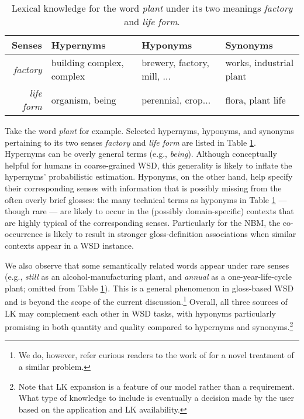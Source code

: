 \documentclass[11pt]{article}
\begin{document}
\def\halfTableWidth{.48\textwidth} \def\cellWidth{16mm}
\begin{table}[t]
  \centering
   \resizebox{\halfTableWidth}{!} {
  \begin{tabular}{r|p{\cellWidth}p{\cellWidth}p{\cellWidth}}
    \hline
    \hline
    Senses   &Hypernyms&Hyponyms &Synonyms\\
    \hline
    \textit{factory} & building complex, complex & brewery,
    factory, mill, ...  & works, industrial plant\\
    \hline
    \textit{life form} & organism, being & perennial, crop...  & flora, plant life\\
    \hline
    \hline
  \end{tabular}}
  \caption{Lexical knowledge for the word \textit{plant}
    under its two meanings \textit{factory} and \textit{life form}.}
\label{tab:plant_lex_knowledge}
\end{table}
Take the word \textit{plant} for example. Selected hypernyms,
hyponyms, and synonyms pertaining to its two senses \textit{factory}
and \textit{life form} are listed in Table
\ref{tab:plant_lex_knowledge}. Hypernyms can be overly general terms
(e.g., \textit{being}). Although conceptually helpful for humans in
coarse-grained WSD, this generality is likely to inflate the
hypernyms' probabilistic estimation. Hyponyms, on the other hand, help
specify their corresponding senses with information that is possibly
missing from the often overly brief glosses: the many technical terms
as hyponyms in Table \ref{tab:plant_lex_knowledge} --- though rare ---
are likely to occur in the (possibly domain-specific) contexts that
are highly typical of the corresponding senses. Particularly for the
NBM, the co-occurrence is likely to result in stronger
gloss-definition associations when similar contexts appear in a WSD
instance.

We also observe that some semantically related words appear under rare
senses (e.g., \textit{still} as an alcohol-manufacturing plant, and
\textit{annual} as a one-year-life-cycle plant; omitted from Table
\ref{tab:plant_lex_knowledge}). This is a general phenomenon in
gloss-based WSD and is beyond the scope of the current
discussion.\footnote{We do, however, refer curious readers to the work
  of \citet{raviv2012concept} for a novel treatment of a similar
  problem.} Overall, all three sources of LK may complement each other
in WSD tasks, with hyponyms particularly promising in both quantity
and quality compared to hypernyms and synonyms.\footnote{Note that LK
  expansion is a feature of our model rather than a requirement. What
  type of knowledge to include is eventually a decision made by the
  user based on the application and LK availability.}
\end{document}
